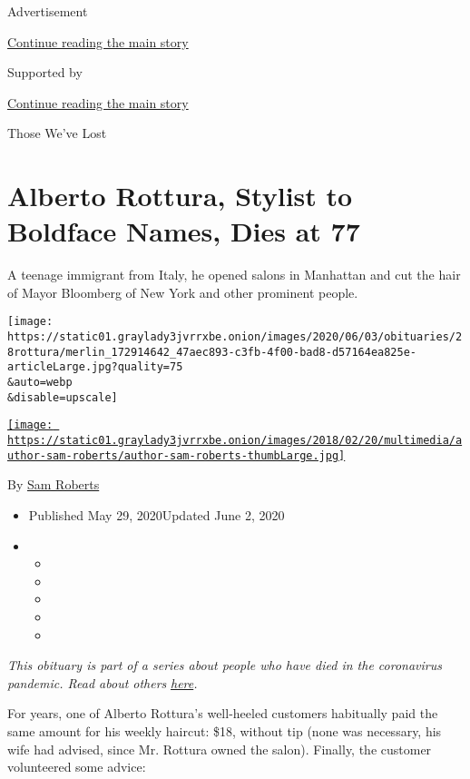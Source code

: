 Advertisement

\protect\hyperlink{after-top}{Continue reading the main story}

Supported by

\protect\hyperlink{after-sponsor}{Continue reading the main story}

Those We've Lost

\hypertarget{alberto-rottura-stylist-to-boldface-names-dies-at-77}{%
\section{Alberto Rottura, Stylist to Boldface Names, Dies at
77}\label{alberto-rottura-stylist-to-boldface-names-dies-at-77}}

A teenage immigrant from Italy, he opened salons in Manhattan and cut
the hair of Mayor Bloomberg of New York and other prominent people.

\texttt{[image: https://static01.graylady3jvrrxbe.onion/images/2020/06/03/obituaries/28rottura/merlin\_172914642\_47aec893-c3fb-4f00-bad8-d57164ea825e-articleLarge.jpg?quality=75\\\&auto=webp\\\&disable=upscale]}

\href{https://www.nytimes3xbfgragh.onion/by/sam-roberts}{\texttt{[image: https://static01.graylady3jvrrxbe.onion/images/2018/02/20/multimedia/author-sam-roberts/author-sam-roberts-thumbLarge.jpg]}}

By \href{https://www.nytimes3xbfgragh.onion/by/sam-roberts}{Sam Roberts}

\begin{itemize}
\item
  Published May 29, 2020Updated June 2, 2020
\item
  \begin{itemize}
  \item
  \item
  \item
  \item
  \item
  \end{itemize}
\end{itemize}

\emph{This obituary is part of a series about people who have died in
the coronavirus pandemic. Read about others}
\href{https://www.nytimes3xbfgragh.onion/interactive/2020/obituaries/people-died-coronavirus-obituaries.html}{\emph{here}}\emph{.}

For years, one of Alberto Rottura's well-heeled customers habitually
paid the same amount for his weekly haircut: \$18, without tip (none was
necessary, his wife had advised, since Mr. Rottura owned the salon).
Finally, the customer volunteered some advice:

